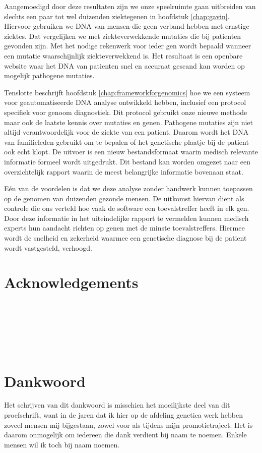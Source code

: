 \begin{appendices}
	Aangemoedigd door deze resultaten zijn we onze speelruimte gaan uitbreiden van slechts een paar tot wel duizenden ziektegenen in hoofdstuk \ref{chap:gavin}.
	Hiervoor gebruiken we DNA van mensen die geen verband hebben met ernstige ziektes.
	Dat vergelijken we met ziekteverwekkende mutaties die bij patienten gevonden zijn.
	Met het nodige rekenwerk voor ieder gen wordt bepaald wanneer een mutatie waarschijnlijk ziekteverwekkend is.
	Het resultaat is een openbare website waar het DNA van patienten snel en accuraat gescand kan worden op mogelijk pathogene mutaties.
	
	Tenslotte beschrijft hoofdstuk \ref{chap:frameworkforgenomics} hoe we een systeem voor geautomatiseerde DNA analyse ontwikkeld hebben, inclusief een protocol specifiek voor genoom diagnostiek.
	Dit protocol gebruikt onze nieuwe methode maar ook de laatste kennis over mutaties en genen.
	Pathogene mutaties zijn niet altijd verantwoordelijk voor de ziekte van een patient.
	Daarom wordt het DNA van familieleden gebruikt om te bepalen of het genetische plaatje bij de patient ook echt klopt.
	De uitvoer is een nieuw bestandsformaat waarin medisch relevante informatie formeel wordt uitgedrukt.
	Dit bestand kan worden omgezet naar een overzichtelijk rapport waarin de meest belangrijke informatie bovenaan staat.
	
	Eén van de voordelen is dat we deze analyse zonder handwerk kunnen toepassen op de genomen van duizenden gezonde mensen.
	De uitkomst hiervan dient als controle die ons verteld hoe vaak de software een toevalstreffer heeft in elk gen.
	Door deze informatie in het uiteindelijke rapport te vermelden kunnen medisch experts hun aandacht richten op genen met de minste toevalstreffers.
	Hiermee wordt de snelheid en zekerheid waarmee een genetische diagnose bij de patient wordt vastgesteld, verhoogd.
	
	\chapter{Acknowledgements}
	
	\newpage
	~\\~\\~\\~\\~\\
	
	\chapter{Dankwoord}
	Het schrijven van dit dankwoord is misschien het moeilijkste deel van dit proefschrift, want in de jaren dat ik hier op de afdeling genetica werk hebben zoveel mensen mij bijgestaan, zowel voor als tijdens mijn promotietraject. Het is daarom onmogelijk om iedereen die dank verdient bij naam te noemen. Enkele mensen wil ik toch bij naam noemen.\\
	

\end{appendices}
